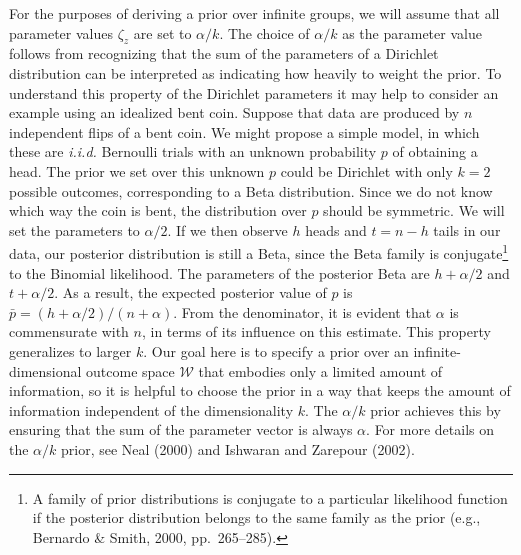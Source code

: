 \documentclass[authoryear]{elsarticle}
\begin{document}
For the purposes of deriving a prior over infinite groups, we will assume that all
parameter values $\zeta_z$ are set to $\alpha/k$.
The choice of $\alpha/k$ as the parameter value follows from
recognizing that the sum of the parameters of a Dirichlet distribution can be
 interpreted as indicating how heavily to weight the prior.  To understand this property
of the Dirichlet parameters it may help to
consider an example using an idealized bent coin. Suppose that data
are produced by $n$ independent flips of a bent coin. We might propose a simple
model, in which these are {\it i.i.d.} Bernoulli trials with an unknown probability
$p$ of obtaining a head. The prior we set over this unknown $p$ could be Dirichlet
with only $k=2$ possible outcomes, corresponding to a Beta distribution. Since we do not
know which way the coin is bent, the distribution over $p$ should be symmetric.
We will set the parameters to $\alpha/2$. If we then observe $h$ heads and
$t=n-h$ tails in our data, our posterior distribution is still a Beta, since the Beta family
is conjugate\footnote{A family of prior distributions is conjugate to
a particular likelihood function if the posterior distribution belongs to the same family as
the prior (e.g., Bernardo \& Smith, 2000, pp.~265--285).}
to the Binomial likelihood. The parameters of the posterior Beta are
$h+\alpha/2$ and $t+\alpha/2$.
As a result, the expected posterior value of $p$ is
$\bar{p} = (h + \alpha/2)/(n+\alpha)$. From the denominator, it is evident
that $\alpha$ is commensurate with $n$, in terms of its influence on this estimate.
This property generalizes to larger $k$. Our goal here is to specify a prior over
an infinite-dimensional outcome space $\mathcal{W}$ that embodies only a limited
amount of information, so it is helpful to choose the prior in a way that keeps the
amount of information independent of the dimensionality $k$.
The $\alpha/k$ prior achieves this by ensuring that the sum of the parameter
vector is always $\alpha$. For more details on the $\alpha/k$ prior, see Neal (2000)
and Ishwaran and Zarepour (2002).
\end{document}

